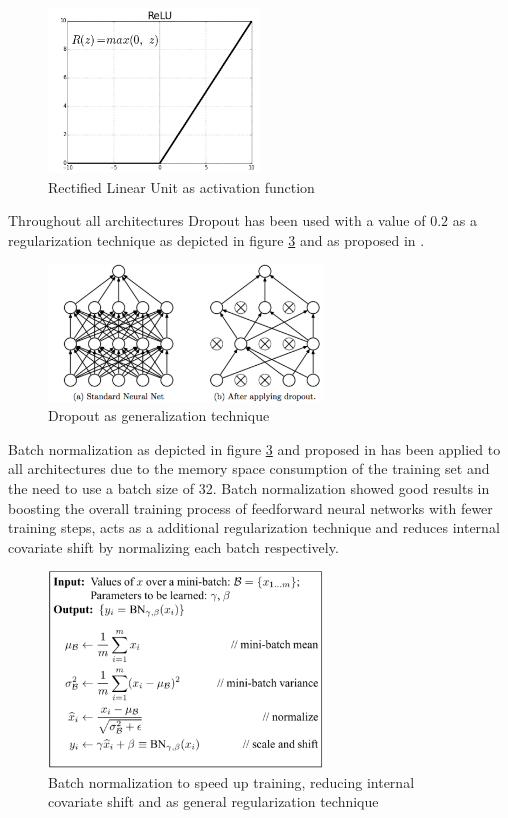 \documentclass{article}
\theoremstyle{definition}
\theoremstyle{remark}
\begin{document}
\begin{figure}[h!]
    \centering
    \includegraphics[width=0.5\textwidth]{img/relu.png}
    \caption{Rectified Linear Unit as activation function}
    \label{fig:relu}
\end{figure}

Throughout all architectures Dropout has been used \cite{srivastava2014dropout} with a value of $0.2$ as a regularization technique as depicted in figure \ref{fig:dropout} and as proposed in \cite{dahl2013improving}.


\begin{figure}[h!]
    \centering
    \includegraphics[width=0.65\textwidth]{img/dropout.png}
    \caption{Dropout as generalization technique}
    \label{fig:dropout}
\end{figure}

Batch normalization as depicted in figure \ref{fig:dropout} and proposed in \cite{ioffe2015batch} has been applied to all architectures due to the memory space consumption of the training set and the need to use a batch size of 32. Batch normalization showed good results in boosting the overall training process of feedforward neural networks with fewer training steps, acts as a additional regularization technique and reduces internal covariate shift by normalizing each batch respectively. 


\begin{figure}[h!]
    \centering
    \includegraphics[width=0.65\textwidth]{img/bn.png}
    \caption{Batch normalization to speed up training, reducing internal covariate shift and as general regularization technique}
    \label{fig:dropout}
\end{figure}
\end{document}

